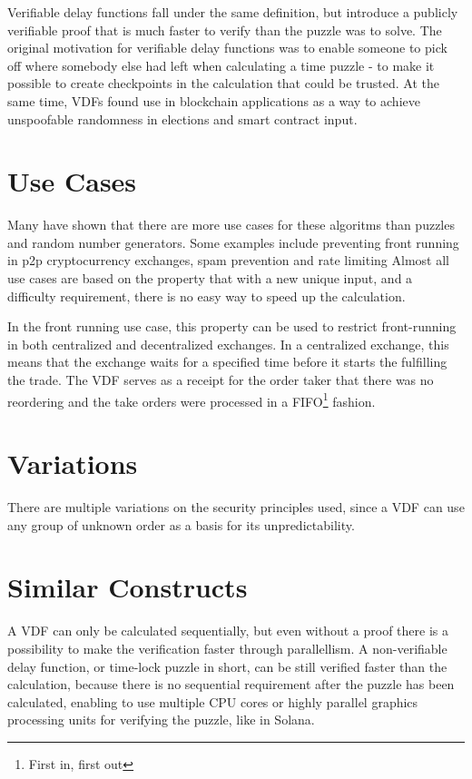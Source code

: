 Verifiable delay functions fall under the same definition, but introduce a publicly verifiable proof that is much faster to verify than the puzzle was to solve. The original motivation for verifiable delay functions was to enable someone to pick off where somebody else had left when calculating a time puzzle - to make it possible to create checkpoints in the calculation that could be trusted. At the same time, VDFs found use in blockchain applications as a way to achieve unspoofable randomness in elections and smart contract input.

\section{Use Cases}
Many have shown that there are more use cases for these algoritms than puzzles and random number generators. Some examples include preventing front running in p2p cryptocurrency exchanges, spam prevention and rate limiting\cite{noauthor_undated-hk} Almost all use cases are based on the property that with a new unique input, and a difficulty requirement, there is no easy way to speed up the calculation.

In the front running use case, this property can be used to restrict front-running in both centralized and decentralized exchanges.\cite{Khalil2019-sl} In a centralized exchange, this means that the exchange waits for a specified time before it starts the fulfilling the trade. The VDF serves as a receipt for the order taker that there was no reordering and the take orders were processed in a FIFO\footnote{First in, first out} fashion.\cite{Cline2020-wb}

\section{Variations}
There are multiple variations on the security principles used, since a VDF can use any group of unknown order as a basis for its unpredictability.

\section{Similar Constructs}
A VDF can only be calculated sequentially, but even without a proof there is a possibility to make the verification faster through parallellism. A non-verifiable delay function, or time-lock puzzle in short, can be still verified faster than the calculation, because there is no sequential requirement after the puzzle has been calculated, enabling to use multiple CPU cores or highly parallel graphics processing units for verifying the puzzle, like in Solana.\cite{Yakovenko2018-zn} 

